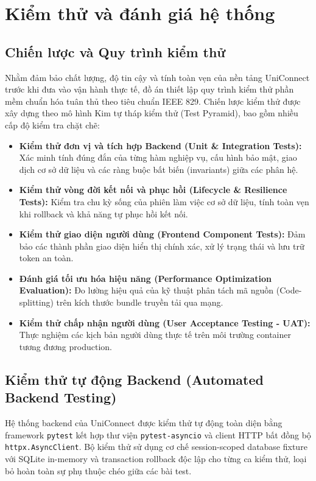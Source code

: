 \section{Kiểm thử và đánh giá hệ thống}

\subsection{Chiến lược và Quy trình kiểm thử}
Nhằm đảm bảo chất lượng, độ tin cậy và tính toàn vẹn của nền tảng UniConnect trước khi đưa vào vận hành thực tế, đồ án thiết lập quy trình kiểm thử phần mềm chuẩn hóa tuân thủ theo tiêu chuẩn IEEE 829\cite{ieee829test}. Chiến lược kiểm thử được xây dựng theo mô hình Kim tự tháp kiểm thử (Test Pyramid), bao gồm nhiều cấp độ kiểm tra chặt chẽ:
\begin{itemize}
    \item \textbf{Kiểm thử đơn vị và tích hợp Backend (Unit \& Integration Tests):} Xác minh tính đúng đắn của từng hàm nghiệp vụ, cấu hình bảo mật, giao dịch cơ sở dữ liệu và các ràng buộc bất biến (invariants) giữa các phân hệ.
    \item \textbf{Kiểm thử vòng đời kết nối và phục hồi (Lifecycle \& Resilience Tests):} Kiểm tra chu kỳ sống của phiên làm việc cơ sở dữ liệu, tính toàn vẹn khi rollback và khả năng tự phục hồi kết nối.
    \item \textbf{Kiểm thử giao diện người dùng (Frontend Component Tests):} Đảm bảo các thành phần giao diện hiển thị chính xác, xử lý trạng thái và lưu trữ token an toàn.
    \item \textbf{Đánh giá tối ưu hóa hiệu năng (Performance Optimization Evaluation):} Đo lường hiệu quả của kỹ thuật phân tách mã nguồn (Code-splitting) trên kích thước bundle truyền tải qua mạng.
    \item \textbf{Kiểm thử chấp nhận người dùng (User Acceptance Testing - UAT):} Thực nghiệm các kịch bản người dùng thực tế trên môi trường container tương đương production.
\end{itemize}

\subsection{Kiểm thử tự động Backend (Automated Backend Testing)}
Hệ thống backend của UniConnect được kiểm thử tự động toàn diện bằng framework \texttt{pytest} kết hợp thư viện \texttt{pytest-asyncio} và client HTTP bất đồng bộ \texttt{httpx.AsyncClient}. Bộ kiểm thử sử dụng cơ chế session-scoped database fixture với SQLite in-memory và transaction rollback độc lập cho từng ca kiểm thử, loại bỏ hoàn toàn sự phụ thuộc chéo giữa các bài test.

